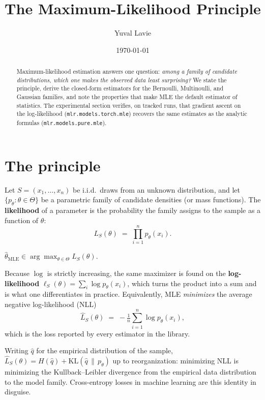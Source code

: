 \documentclass[11pt]{article}
\title{The Maximum-Likelihood Principle}
\author{Yuval Lavie}
\date{\today}
\begin{document}
\maketitle

\begin{abstract}
Maximum-likelihood estimation answers one question: \emph{among a family of
candidate distributions, which one makes the observed data least surprising?}
We state the principle, derive the closed-form estimators for the Bernoulli,
Multinoulli, and Gaussian families, and note the properties that make MLE the
default estimator of statistics. The experimental section verifies, on
tracked runs, that gradient ascent on the log-likelihood
(\texttt{mlr.models.torch.mle}) recovers the same estimates as the analytic
formulas (\texttt{mlr.models.pure.mle}).
\end{abstract}

\section{The principle}

Let $S = (x_1, \dots, x_n)$ be i.i.d.\ draws from an unknown distribution,
and let $\{p_\theta : \theta \in \Theta\}$ be a parametric family of
candidate densities (or mass functions). The \textbf{likelihood} of a
parameter is the probability the family assigns to the sample as a function
of $\theta$:
\begin{equation}
  L_S(\theta) \;=\; \prod_{i=1}^{n} p_\theta(x_i).
\end{equation}

\begin{definition}
$\hat{\theta}_{\mathrm{MLE}} \in \arg\max_{\theta \in \Theta} L_S(\theta)$.
\end{definition}

Because $\log$ is strictly increasing, the same maximizer is found on the
\textbf{log-likelihood} $\ell_S(\theta) = \sum_i \log p_\theta(x_i)$, which
turns the product into a sum and is what one differentiates in practice.
Equivalently, MLE \emph{minimizes} the average negative log-likelihood
(NLL)
\begin{equation}
  \widehat{L}_S(\theta) \;=\; -\tfrac{1}{n} \sum_{i=1}^{n} \log p_\theta(x_i),
  \label{eq:nll}
\end{equation}
which is the loss reported by every estimator in the library.

\begin{remark}
Writing $\hat{q}$ for the empirical distribution of the sample,
$\widehat{L}_S(\theta) = H(\hat{q}) + \mathrm{KL}(\hat{q} \,\|\, p_\theta)$
up to reorganization: minimizing NLL is minimizing the Kullback–Leibler
divergence from the empirical data distribution to the model family.
Cross-entropy losses in machine learning are this identity in disguise.
\end{remark}
\end{document}
